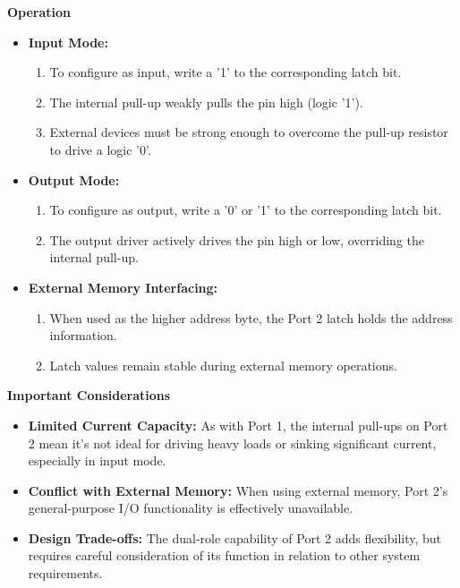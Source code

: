 \documentclass[
]{article}
\begin{document}
\textbf{Operation}

\begin{itemize}
\item
  \textbf{Input Mode:}

  \begin{enumerate}
  \def\labelenumi{\arabic{enumi}.}
  \item
    To configure as input, write a '1' to the corresponding latch bit.
  \item
    The internal pull-up weakly pulls the pin high (logic '1').
  \item
    External devices must be strong enough to overcome the pull-up
    resistor to drive a logic '0'.
  \end{enumerate}
\item
  \textbf{Output Mode:}

  \begin{enumerate}
  \def\labelenumi{\arabic{enumi}.}
  \item
    To configure as output, write a '0' or '1' to the corresponding
    latch bit.
  \item
    The output driver actively drives the pin high or low, overriding
    the internal pull-up.
  \end{enumerate}
\item
  \textbf{External Memory Interfacing:}

  \begin{enumerate}
  \def\labelenumi{\arabic{enumi}.}
  \item
    When used as the higher address byte, the Port 2 latch holds the
    address information.
  \item
    Latch values remain stable during external memory operations.
  \end{enumerate}
\end{itemize}

\textbf{Important Considerations}

\begin{itemize}
\item
  \textbf{Limited Current Capacity:} As with Port 1, the internal
  pull-ups on Port 2 mean it's not ideal for driving heavy loads or
  sinking significant current, especially in input mode.
\item
  \textbf{Conflict with External Memory:} When using external memory,
  Port 2's general-purpose I/O functionality is effectively unavailable.
\item
  \textbf{Design Trade-offs:} The dual-role capability of Port 2 adds
  flexibility, but requires careful consideration of its function in
  relation to other system requirements.
\end{itemize}
\end{document}

